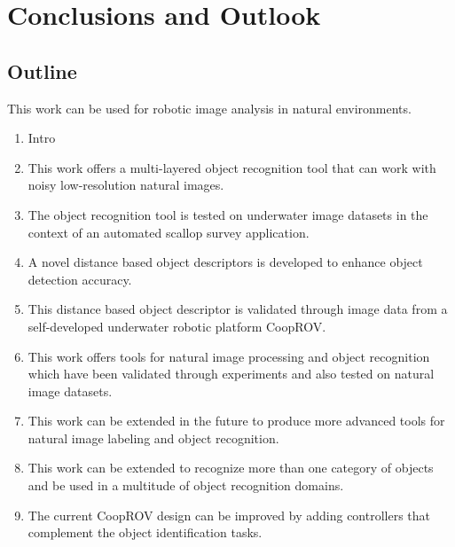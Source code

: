 \documentclass {udthesis}
\begin{document}

\chapter{Conclusions and Outlook}
\label{chap:thesis_conclusion}

\section{Outline}


This work can be used for robotic image analysis in natural environments.

\begin{enumerate}[label=Section \arabic*:, start=0]
\item Intro

\item This work offers a multi-layered object recognition tool that can work with noisy low-resolution natural images.

\item The object recognition tool is tested on underwater image datasets in the context of an automated scallop survey application.

\item A novel distance based object descriptors is developed to enhance object detection accuracy.

\item This distance based object descriptor is validated through image data from a self-developed underwater robotic platform CoopROV.

\item This work offers tools for natural image processing and object recognition which have been validated through experiments and also tested on natural image datasets.

\item This work can be extended in the future to produce more advanced tools for natural image labeling and object recognition.

\item This work can be extended to recognize more than one category of objects and be used in a multitude of object recognition domains. 

\item The current CoopROV design can be improved by adding controllers that complement the object identification tasks.

\end{enumerate}
\end{document}
